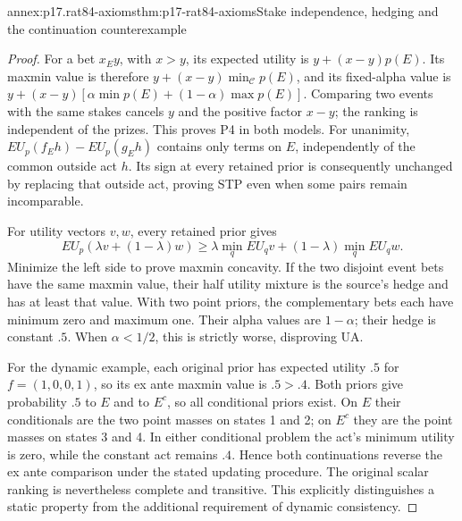 \begin{annexitem}{annex:p17.rat84-axioms}{thm:p17-rat84-axioms}{Stake independence, hedging and the continuation counterexample}
\begin{proof}
For a bet \(x_Ey\), with \(x>y\), its expected utility is
\(y+(x-y)p(E)\). Its maxmin value is therefore
\(y+(x-y)\min_{\mathcal C}p(E)\), and its fixed-alpha value
is \(y+(x-y)[\alpha\min p(E)+(1-\alpha)\max p(E)]\).
Comparing two events with the same stakes cancels \(y\) and
the positive factor \(x-y\); the ranking is independent of
the prizes. This proves P4 in both models.
For unanimity, \(EU_p(f_Eh)-EU_p(g_Eh)\) contains only terms
on \(E\), independently of the common outside act \(h\).
Its sign at every retained prior is consequently unchanged by
replacing that outside act, proving STP even when some pairs
remain incomparable.

For utility vectors \(v,w\), every retained prior gives
\[
 EU_p(\lambda v+(1-\lambda)w)
 \geq\lambda\min_q EU_qv+(1-\lambda)\min_q EU_qw.
\]
Minimize the left side to prove maxmin concavity. If the two
disjoint event bets have the same maxmin value, their half
utility mixture is the source's hedge and has at least that
value. With two point priors, the complementary bets each
have minimum zero and maximum one. Their alpha values are
\(1-\alpha\); their hedge is constant \(.5\). When
\(\alpha<1/2\), this is strictly worse, disproving UA.

For the dynamic example, each original prior has expected
utility \(.5\) for \(f=(1,0,0,1)\), so its ex ante maxmin
value is \(.5>.4\). Both priors give probability \(.5\)
to \(E\) and to \(E^c\), so all conditional priors exist.
On \(E\) their conditionals are the two point masses on
states 1 and 2; on \(E^c\) they are the point masses on
states 3 and 4. In either conditional problem the act's
minimum utility is zero, while the constant act remains
\(.4\). Hence both continuations reverse the ex ante
comparison under the stated updating procedure. The original
scalar ranking is nevertheless complete and transitive.
This explicitly distinguishes a static property from the
additional requirement of dynamic consistency.
\end{proof}
\end{annexitem}


